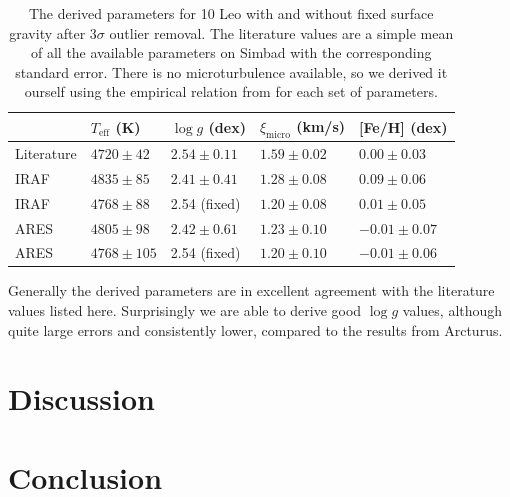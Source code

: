 \documentclass{aa}
\begin{document}
\begin{table}[htb!]
    \caption{The derived parameters for 10 Leo with and without fixed surface
             gravity after 3$\sigma$ outlier removal. The literature values are
             a simple mean of all the available parameters on Simbad with the
             corresponding standard error. There is no microturbulence
             available, so we derived it ourself using the empirical relation
             from \citet{Adibekyan2015} for each set of parameters.}
    \label{tab:10Leo}
    \centering
    \begin{tabular}{lllll}
      \hline\hline
                     & $T_\mathrm{eff}$ (K) &  $\log g$ (dex)  &   $\xi_\mathrm{micro}$ (km/s)   & [Fe/H] (dex)     \\
      \hline
        Literature   & $4720 \pm  42$       &  $2.54 \pm 0.11$ &    $1.59 \pm 0.02$              & $ 0.00 \pm 0.03$ \\
      \hline
        IRAF         & $4835 \pm  85$       &  $2.41 \pm 0.41$ &    $1.28 \pm 0.08$              & $ 0.09 \pm 0.06$ \\
        IRAF         & $4768 \pm  88$       &   2.54 (fixed)   &    $1.20 \pm 0.08$              & $ 0.01 \pm 0.05$ \\
      \hline
        ARES         & $4805 \pm  98$       &  $2.42 \pm 0.61$ &    $1.23 \pm 0.10$              & $-0.01 \pm 0.07$ \\
        ARES         & $4768 \pm 105$       &   2.54 (fixed)   &    $1.20 \pm 0.10$              & $-0.01 \pm 0.06$ \\
      \hline
    \end{tabular}
\end{table}

Generally the derived parameters are in excellent agreement with the literature
values listed here. Surprisingly we are able to derive good $\log g$ values,
although quite large errors and consistently lower, compared to the results from
Arcturus.



\section{Discussion}
\label{sec:discussion}



\section{Conclusion}
\label{sec:conclusion}
\end{document}
